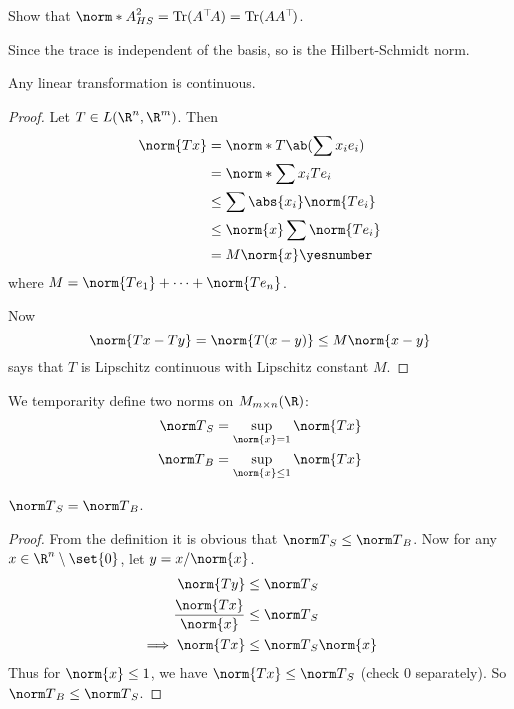 \begin{exercise}
    Show that $\hsn A^2 = \Tr(A^\T A) = \Tr(AA^\T)$.
\end{exercise}
Since the trace is independent of the basis, so is the Hilbert-Schmidt norm.
\begin{proposition}
    Any linear transformation is continuous.
\end{proposition}
\begin{proof}
    Let $T \in L(\R^n, \R^m)$.
    Then \begin{align*}
        \norm{Tx} &= \norm*{T\ab(\sum x_i e_i)} \\
                 &= \norm*{\sum x_i Te_i} \\
                 &\le \sum \abs{x_i} \norm{T e_i} \\
                 &\le \norm{x} \sum \norm{T e_i} \\
                 &= M \norm{x} \yesnumber \label{eq:operator_norm}
    \end{align*} where $M = \norm{Te_1} + \cdots + \norm{Te_n}$.

    Now \[
        \norm{Tx - Ty} = \norm{T(x - y)} \le M \norm{x - y}
    \] says that $T$ is Lipschitz continuous with Lipschitz constant $M$.
\end{proof}

We temporarity define two norms on $M_{m \times n}(\R)$:
\begin{align*}
    {\norm T}_S &= \sup_{\norm{x} = 1} \norm{Tx} \\
    {\norm T}_B &= \sup_{\norm{x} \le 1} \norm{Tx}
\end{align*}
\begin{lemma} \label{lem:operator_norm}
    ${\norm T}_S = {\norm T}_B$.
\end{lemma}
\begin{proof}
    From the definition it is obvious that ${\norm T}_S \le {\norm T}_B$.
    Now for any $x \in \R^n \setminus \set{0}$, let $y = x/\norm{x}$.
    \begin{align*}
        \norm{Ty} &\le {\norm T}_S \\
        \frac{\norm{Tx}}{\norm{x}} &\le {\norm T}_S \\
        \implies \norm{Tx} &\le {\norm T}_S \norm{x}
    \end{align*} Thus for $\norm{x} \le 1$,
    we have $\norm{Tx} \le {\norm T}_S$ (check $0$ separately).
    So ${\norm T}_B \le {\norm T}_S$.
\end{proof}

